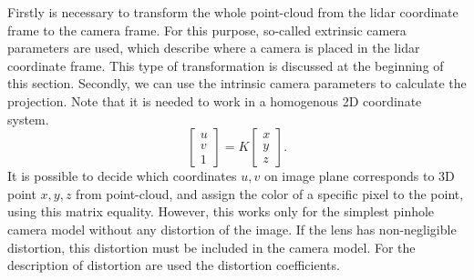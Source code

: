 Firstly is necessary to transform the whole point-cloud from the lidar coordinate frame to the camera frame. For this purpose, so-called extrinsic camera parameters are used, which describe where a camera is placed in the lidar coordinate frame. This type of transformation is discussed at the beginning of this section. Secondly, we can use the intrinsic camera parameters to calculate the projection. Note that it is needed to work in a homogenous 2D coordinate system.
\begin{equation}
\begin{bmatrix}
u\\
v\\
1
\end{bmatrix}
= K \begin{bmatrix}
x\\
y\\
z
\end{bmatrix}.
\end{equation}
It is possible to decide which coordinates $u,v$ on image plane corresponds to 3D point $x,y,z$ from point-cloud, and assign the color of a specific pixel to the point, using this matrix equality. However, this works only for the simplest pinhole camera model without any distortion of the image. If the lens has non-negligible distortion, this distortion must be included in the camera model. For the description of distortion are used the distortion coefficients.